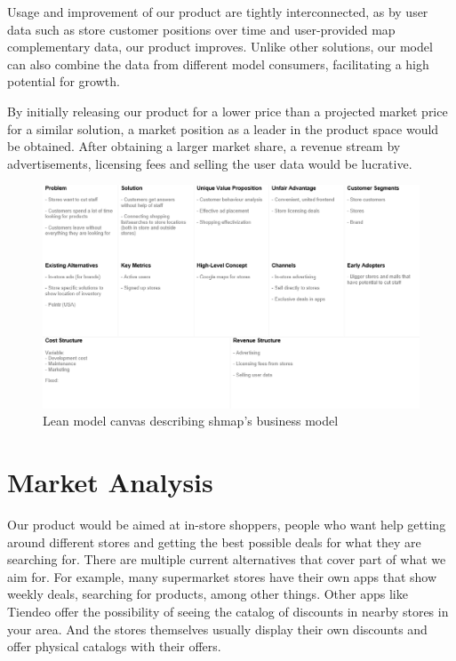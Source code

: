 \documentclass[titlepage]{article}
\def\companyName{shmap}
\begin{document}
Usage and improvement of our product are tightly interconnected, as by user data such as store customer positions over time 
and user-provided map complementary data, our product improves. 
Unlike other solutions, our model can also combine the data from different model consumers, 
facilitating a high potential for growth.

By initially releasing our product for a lower price than a projected market price for a similar solution,
a market position as a leader in the product space would be obtained.
After obtaining a larger market share, a revenue stream by advertisements, 
licensing fees and selling the user data would be lucrative.

\begin{figure}[h]
    \centering
    \includegraphics[width=1\textwidth]{lean model canvas.png}
    \caption{Lean model canvas describing \companyName's business model}
    \label{fig:enter-label}
\end{figure}

\section{Market Analysis}
Our product would be aimed at in-store shoppers, people who want help getting around different stores and getting the best possible deals for what they are searching for. There are multiple current alternatives that cover part of what we aim for. For example, many supermarket stores have their own apps that show weekly deals, searching for products, among other things. Other apps like Tiendeo offer the possibility of seeing the catalog of discounts in nearby stores in your area. And the stores themselves usually display their own discounts and offer physical catalogs with their offers. 
\end{document}
